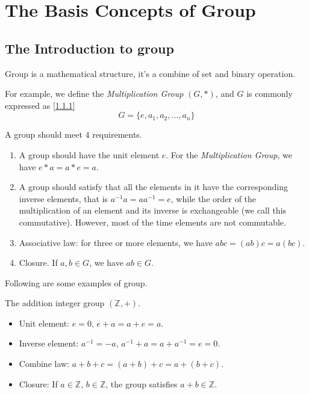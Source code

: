 \chapter{The Basis Concepts of Group}

\section{The Introduction to group}

\begin{definition}
    Group is a mathematical structure, it's a combine of set and binary operation.
\end{definition}

For example, we define the \emph{Multiplication Group} $(G,*)$, and $G$ is commonly expressed as \eqref{1.1.1}
\begin{equation}
    G=\{e,a_1,a_2,\ldots,a_n\}
    \label{1.1.1}
\end{equation}

A group should meet 4 requirements.
\begin{proposition}\leavevmode
\begin{enumerate}
    \item A group should have the unit element $e$. For the \emph{Multiplication Group}, we have $e*a=a*e=a$.
    \item A group should satisfy that all the elements in it have the corresponding inverse elements, that is $a^{-1}a=aa^{-1}=e$, while the order of the multiplication of an element and its inverse is exchangeable (we call this commutative). However, most of the time elements are not commutable.
    \item Associative law: for three or more elements, we have $abc=(ab)c=a(bc)$.
    \item Closure. If $a,b\in G$, we have $ab\in G$.
\end{enumerate}
\end{proposition}

Following are some examples of group.

\begin{example}
    The addition integer group $(\mathbb Z,+)$.
    \begin{itemize}
        \item Unit element: $e=0$, $e+a=a+e=a$.
        \item Inverse element: $a^{-1}=-a$, $a^{-1}+a=a+a^{-1}=e=0$.
        \item Combine law: $a+b+c=(a+b)+c=a+(b+c)$.
        \item Closure: If $a\in\mathbb Z$, $b\in\mathbb Z$, the group satisfies $a+b\in\mathbb Z$.
    \end{itemize}
\end{example}


